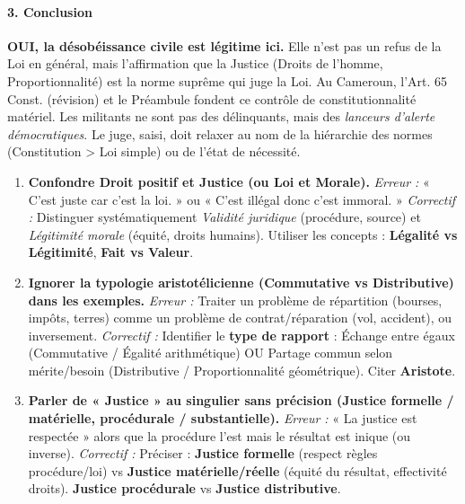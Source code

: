 \documentclass[11pt]{article}
\newcommand{\cle}[1]{{\popxbold\color{popdark}#1}}
\begin{document}
\begin{exoresolu}
    \paragraph{3. Conclusion}
    \textbf{OUI, la désobéissance civile est légitime ici.} Elle n'est pas un refus de la Loi en général, mais l'affirmation que la \cle{Justice} (Droits de l'homme, Proportionnalité) est la norme suprême qui juge la \cle{Loi}. Au Cameroun, l'Art. 65 Const. (révision) et le Préambule fondent ce contrôle de constitutionnalité matériel. Les militants ne sont pas des délinquants, mais des \emph{lanceurs d'alerte démocratiques}. Le juge, saisi, doit relaxer au nom de la hiérarchie des normes (Constitution > Loi simple) ou de l'état de nécessité.
\end{exoresolu}

\begin{attention}
    \begin{enumerate}
        \item \textbf{Confondre \cle{Droit positif} et \cle{Justice} (ou \cle{Loi} et \cle{Morale}).} 
            \textit{Erreur :} « C'est juste car c'est la loi. » ou « C'est illégal donc c'est immoral. »
            \textit{Correctif :} Distinguer systématiquement \emph{Validité juridique} (procédure, source) et \emph{Légitimité morale} (équité, droits humains). Utiliser les concepts : \textbf{Légalité vs Légitimité}, \textbf{Fait vs Valeur}.
        \item \textbf{Ignorer la typologie aristotélicienne (Commutative vs Distributive) dans les exemples.}
            \textit{Erreur :} Traiter un problème de répartition (bourses, impôts, terres) comme un problème de contrat/réparation (vol, accident), ou inversement.
            \textit{Correctif :} Identifier le \textbf{type de rapport} : Échange entre égaux (Commutative / Égalité arithmétique) OU Partage commun selon mérite/besoin (Distributive / Proportionnalité géométrique). Citer \textbf{Aristote}.
        \item \textbf{Parler de « Justice » au singulier sans précision (Justice formelle / matérielle, procédurale / substantielle).}
            \textit{Erreur :} « La justice est respectée » alors que la procédure l'est mais le résultat est inique (ou inverse).
            \textit{Correctif :} Préciser : \textbf{Justice formelle} (respect règles procédure/loi) vs \textbf{Justice matérielle/réelle} (équité du résultat, effectivité droits). \textbf{Justice procédurale} vs \textbf{Justice distributive}.

\end{enumerate}
\end{attention}
\end{document}
